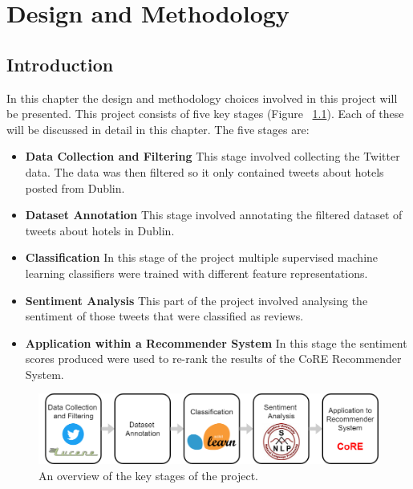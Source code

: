 \chapter{Design and Methodology}

\section{Introduction}

In this chapter the design and methodology choices involved in this project will be presented. This project consists of five key stages (Figure ~\ref{fig:pipeline}). Each of these will be discussed in detail in this chapter. The five stages are:
\begin{itemize}
    \item \textbf{Data Collection and Filtering}\newline
    This stage involved collecting the Twitter data. The data was then filtered so it only contained tweets about hotels posted from Dublin.
    \item \textbf{Dataset Annotation}\newline
    This stage involved annotating the filtered dataset of tweets about hotels in Dublin.
    \item \textbf{Classification}\newline 
    In this stage of the project multiple supervised machine learning classifiers were trained with different feature representations.
    \item \textbf{Sentiment Analysis}\newline 
    This part of the project involved analysing the sentiment of those tweets that were classified as reviews.
    \item \textbf{Application within a Recommender System}\newline
    In this stage the sentiment scores produced were used to re-rank the results of the CoRE \cite{core2019} Recommender System.
\end{itemize}

\begin{figure}[h!]
\centering
\includegraphics[width=1\textwidth]{design_and_methodology/pipeline.png}
\caption{\label{fig:pipeline} An overview of the key stages of the project.}
\end{figure}

